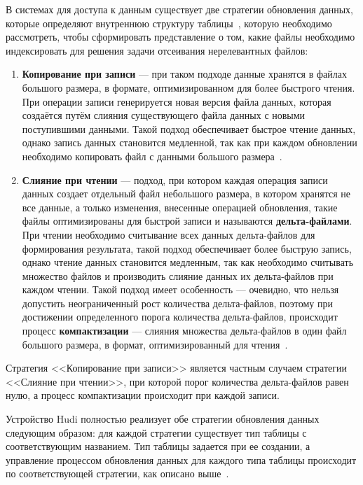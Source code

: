 В системах для доступа к данным существует две стратегии обновления данных, которые определяют внутреннюю структуру таблицы~\cite{Analyzing_and_comparing_lakehouse_storage_systems}, которую необходимо рассмотреть, чтобы сформировать представление о том, какие файлы необходимо индексировать для решения задачи отсеивания нерелевантных файлов: 
\begin{enumerate}
    \item \textbf{Копирование при записи} --- при таком подходе данные хранятся в файлах большого размера, в формате, оптимизированном для более быстрого чтения. При операции записи генерируется новая версия файла данных, которая создаётся путём слияния существующего файла данных с новыми поступившими данными. Такой подход обеспечивает быстрое чтение данных, однако запись данных становится медленной, так как при каждом обновлении необходимо копировать файл с данными большого размера~\cite{Analyzing_and_comparing_lakehouse_storage_systems}.
    \item \textbf{Слияние при чтении} --- подход, при котором каждая операция записи данных создает отдельный файл небольшого размера, в котором хранятся не все данные, а только изменения, внесенные операцией обновления, такие файлы оптимизированы для быстрой записи и называются \textbf{дельта-файлами}. При чтении необходимо считывание всех данных дельта-файлов для формирования результата, такой подход обеспечивает более быструю запись, однако чтение данных становится медленным, так как необходимо считывать множество файлов и производить слияние данных их дельта-файлов при каждом чтении. Такой подход имеет особенность --- очевидно, что нельзя допустить неограниченный рост количества дельта-файлов, поэтому при достижении определенного порога количества дельта-файлов, происходит процесс \textbf{компактизации} --- слияния множества дельта-файлов в один файл большого размера, в формат, оптимизированный для чтения~\cite{Analyzing_and_comparing_lakehouse_storage_systems}. 
\end{enumerate}
Стратегия {<<Копирование при записи>>} является частным случаем стратегии {<<Слияние при чтении>>}, при которой порог количества дельта-файлов равен нулю, а процесс компактизации происходит при каждой записи.

Устройство Hudi полностью реализует обе стратегии обновления данных следующим образом: для каждой стратегии существует тип таблицы с соответствующим названием. Тип таблицы задается при ее создании, а управление процессом обновления данных для каждого типа таблицы происходит по соответствующей стратегии, как описано выше~\cite{Hudi_Table_types}.

